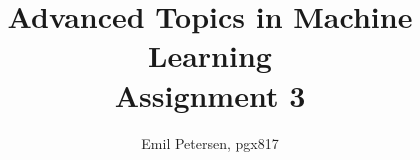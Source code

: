 \title{
    Advanced Topics in Machine Learning\\
    Assignment 3
}

\author{Emil Petersen, pgx817}


\clearpage\maketitle
\setcounter{page}{1}
